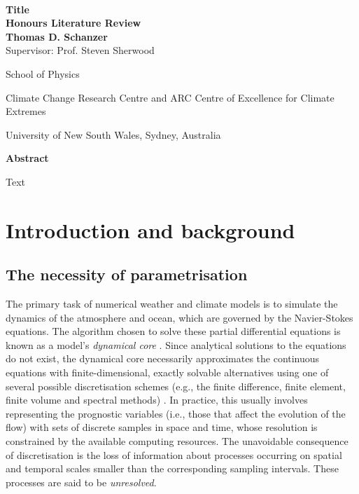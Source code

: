 \documentclass[titlepage]{article}
\numberwithin{equation}{section}
\begin{document}
\begin{titlepage}
\vfill~

\begin{center}
    {\Huge \textbf{%
        Title
    }} \\
    \vspace{0.75cm}
    {\Large\textbf{Honours Literature Review}} \\
    \vspace{0.75cm}
    {\Large\textbf{Thomas D. Schanzer}} \\
    \vspace{6pt}
    {\large Supervisor: Prof. Steven Sherwood} \\
    \vspace{0.75cm}
    {\large%
        School of Physics

        Climate Change Research Centre and
        ARC Centre of Excellence for Climate Extremes

        University of New South Wales, Sydney, Australia
    }
\end{center}
\vfill
\begin{center}
{\large\textbf{Abstract}}

\begin{minipage}{13cm}
    Text
\end{minipage}
\end{center}
\vfill
\end{titlepage}

\newpage
\tableofcontents

\newpage
\pagestyle{fancy}
\thispagestyle{fancy}

\section{Introduction and background}
\subsection{The necessity of parametrisation}
The primary task of numerical weather and climate models is to simulate the
dynamics of the atmosphere and ocean, which are governed by the Navier-Stokes
equations. The algorithm chosen to solve these partial differential equations
is known as a model's \emph{dynamical core} \parencite{mcfarlane2011}. Since
analytical solutions to the equations do not exist, the dynamical core
necessarily approximates the continuous equations with finite-dimensional,
exactly solvable alternatives using one of several possible discretisation
schemes (e.g., the finite difference, finite element, finite volume and
spectral methods) \parencite{christensen2022}. In practice, this usually
involves representing the prognostic variables (i.e., those that affect the
evolution of the flow) with sets of discrete samples in space and time, whose
resolution is constrained by the available computing resources. The unavoidable
consequence of discretisation is the loss of information about processes
occurring on spatial and temporal scales smaller than the corresponding
sampling intervals. These processes are said to be \emph{unresolved}.
\end{document}

